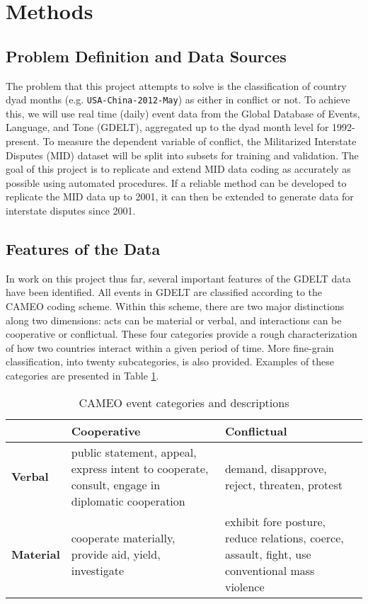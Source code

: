\documentclass[12pt,letterpaper]{article} %
\begin{document}
\section{Methods}

\subsection{Problem Definition and Data Sources}

The problem that this project attempts to solve is the classification of country dyad months (e.g. \texttt{USA-China-2012-May}) as either in conflict or not. To achieve this, we will use real time (daily) event data from the Global Database of Events, Language, and Tone (GDELT), aggregated up to the dyad month level for 1992-present. To measure the dependent variable of conflict, the Militarized Interstate Disputes (MID) dataset will be split into subsets for training and validation. The goal of this project is to replicate and extend MID data coding as accurately as possible using automated procedures. If a reliable method can be developed to replicate the MID data up to 2001, it can then be extended to generate data for interstate disputes since 2001. 


\subsection{Features of the Data}

In work on this project thus far, several important features of the GDELT data have been identified. All events in GDELT are classified according to the CAMEO coding scheme. Within this scheme, there are two major distinctions along two dimensions: acts can be material or verbal, and interactions can be cooperative or conflictual. These four categories provide a rough characterization of how two countries interact within a given period of time. More fine-grain classification, into twenty subcategories, is also provided. Examples of these categories are presented in Table \ref{cameo}.

\begin{table}[t]
\caption{CAMEO event categories and descriptions}
\label{cameo}
\begin{center}
\begin{tabular}{lp{2in}p{2in}}
& \textbf{Cooperative} & \textbf{Conflictual} \\
\midrule
\textbf{Verbal} & public statement, appeal, express intent to cooperate, consult, engage in diplomatic cooperation & demand, disapprove, reject, threaten, protest \\
\textbf{Material} & cooperate materially, provide aid, yield, investigate & exhibit fore posture, reduce relations, coerce, assault, fight, use conventional mass violence
\end{tabular}
\end{center}
\end{table}
\end{document}

